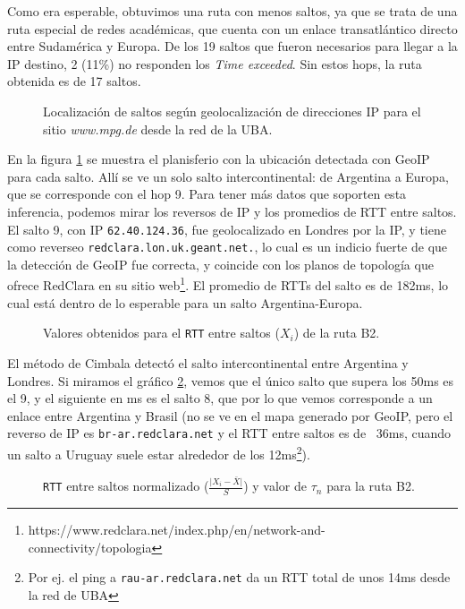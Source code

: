 Como era esperable, obtuvimos una ruta con menos saltos, ya que se trata de una ruta especial de redes académicas, que cuenta con un enlace transatlántico directo entre Sudamérica y Europa.
De los 19 saltos que fueron necesarios para llegar a la IP destino, 2 (11\%) no responden los \emph{Time exceeded}. Sin estos hops, la ruta obtenida es de 17 saltos.

\begin{figure}[H]
    \caption{Localización de saltos según geolocalización de direcciones IP para
    el sitio \emph{www.mpg.de} desde la red de la UBA.}
    \label{res:escb2:map}
\end{figure}

En la figura \ref{res:escb2:map} se muestra el planisferio con la ubicación detectada con GeoIP para cada salto. Allí se ve un solo salto intercontinental: de Argentina a Europa, que se corresponde con el hop 9. Para tener más datos que soporten esta inferencia, podemos mirar los reversos de IP y los promedios de RTT entre saltos. El salto 9, con IP \texttt{62.40.124.36}, fue geolocalizado en Londres por la IP, y tiene como reverseo \texttt{redclara.lon.uk.geant.net.}, lo cual es un indicio fuerte de que la detección de GeoIP fue correcta, y coincide con los planos de topología que ofrece RedClara en su sitio web\footnote{https://www.redclara.net/index.php/en/network-and-connectivity/topologia}. El promedio de RTTs del salto es de 182ms, lo cual está dentro de lo esperable para un salto Argentina-Europa.

\begin{figure}[H]
    \caption{Valores obtenidos para el \texttt{RTT} entre saltos ($X_i$) de la ruta B2.}
    \label{res:escb2:rtt}
\end{figure}

El método de Cimbala detectó el salto intercontinental entre Argentina y Londres. Si miramos el gráfico \ref{res:escb2:rtt}, vemos que el único salto que supera los 50ms es el 9, y el siguiente en ms es el salto 8, que por lo que vemos corresponde a un enlace entre Argentina y Brasil (no se ve en el mapa generado por GeoIP, pero el reverso de IP es \texttt{br-ar.redclara.net} y el RTT entre saltos es de ~36ms, cuando un salto a Uruguay suele estar alrededor de los 12ms\footnote{Por ej. el ping a \texttt{rau-ar.redclara.net} da un RTT total de unos 14ms desde la red de UBA}).

\begin{figure}[H]
    \caption{\texttt{RTT} entre saltos normalizado ($\frac{\vert X_i-\bar{X}\vert}{S}$)
    y valor de $\tau_n$ para la ruta B2.}
    \label{res:escb2:rttnorm}
\end{figure}

